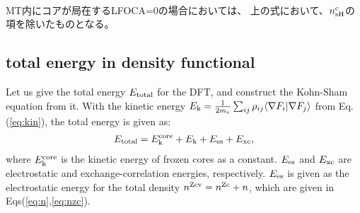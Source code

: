 \documentclass[a4paper,10pt,aip,onecolumn,amsmath,amssymb,floatfix,rmp]{revtex4-1}
\def\nzc{n^{\rm Zc}}
\def\nzcv{n^{\rm Zcv}}
\def\rhoij{\rho_{ij}}
\def\ekcore{E_{\rm k}^{\rm core}}
\def\ek{E_{\rm k}}
\begin{document}
\begin{widetext}
\begin{widetext}
\ \\

MT内にコアが局在するLFOCA=0の場合においては、
上の式において、$n^{\rm c}_{\rm sH}$の項を除いたものとなる。

\subsection{total energy in density functional}
\label{sec:total} Let us give the total energy $E_{\rm total}$ for the
DFT, and construct the Kohn-Sham equation from it. With the kinetic
energy $\ek=\frac{1}{2m_e} \sum_{ij} \rhoij \langle \nabla F_i| \nabla
F_{j} \rangle$ from Eq.(\ref{eq:kin}), the total energy is given as:
\begin{eqnarray}
E_{\rm total}=\ekcore+ \ek+E_{\rm es}+E_{\rm xc},
\label{eq:etot}
\end{eqnarray} 
where $\ekcore$ is the kinetic energy of frozen cores as a constant.
$E_{\rm es}$ and $E_{\rm xc}$ are electrostatic and exchange-correlation
energies, respectively.
$E_{\rm es}$ is given as the electrostatic energy for the
total density $\nzcv =\nzc +n $, which are given in
Eqs(\ref{eq:n},\ref{eq:nzc}). 


\end{widetext}
\end{widetext}
\end{document}
